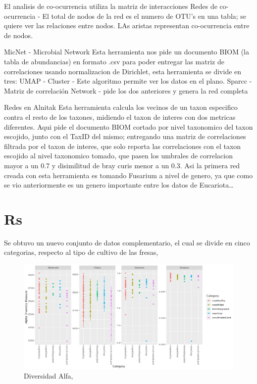 El analisis de co-ocurrencia utiliza la matriz de interacciones
Redes de co-ocurrencia - El total de nodos de la red es el numero de OTU's en una tabla; se quiere ver las relaciones entre nodos. LAs aristas representan co-ocurrencia entre de nodos.

MicNet - Microbial Network
Esta herramienta nos pide un documento BIOM (la tabla de abundancias) en formato .csv para poder entregar las matriz de correlaciones usando normalizacion de Dirichlet, esta herramienta se divide en tres: 
UMAP - Cluster - Este algoritmo permite ver los datos en el plano.
Sparcc - Matriz de correlación
Network - pide los dos anteriores y genera la red completa

Redes en Alnitak
Esta herramienta calcula los vecinos de un taxon especifico contra el resto de los taxones, midiendo el taxon de interes con dos metricas diferentes.
Aqui pide el documento BIOM cortado por nivel taxonomico del taxon escojido, junto con el TaxID del mismo; entregando una matriz de correlaciones filtrada por el taxon de interes, que solo reporta las correlaciones con el taxon escojido al nivel taxonomico tomado, que pasen los umbrales de correlacion mayor a un 0.7 y disimilitud de bray curis menor a un 0.3. 
Asi la primera red creada con esta herramienta es tomando Fusarium a nivel de genero, ya que como se vio anteriormente es un genero importante entre los datos de Eucariota…





\section{Rs}

Se obtuvo un nuevo conjunto de datos complementario, el cual se divide en cinco categorias, respecto al tipo de cultivo de las fresas,

\begin{figure}[!]
\centering
\includegraphics[width=\textwidth]{Img/cap2/AllData_Alfa_diversidad.png}
\caption{Diversidad Alfa, }
\end{figure}


